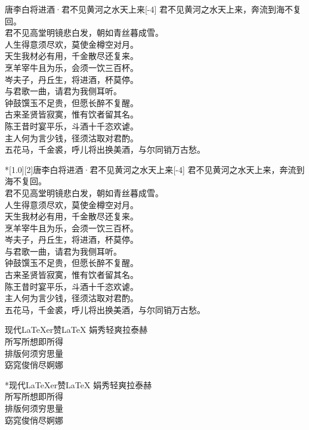 \documentclass{ctexart}
\begin{document}
\centering

\begin{poem}[1.0][2]{唐}{李白}{将进酒·君不见黄河之水天上来}[-4]
君不见黄河之水天上来，奔流到海不复回。\\
君不见高堂明镜悲白发，朝如青丝暮成雪。\\
人生得意须尽欢，莫使金樽空对月。\\
天生我材必有用，千金散尽还复来。\\
烹羊宰牛且为乐，会须一饮三百杯。\\
岑夫子，丹丘生，将进酒，杯莫停。\\
与君歌一曲，请君为我侧耳听。\\
钟鼓馔玉不足贵，但愿长醉不复醒。\\
古来圣贤皆寂寞，惟有饮者留其名。\\
陈王昔时宴平乐，斗酒十千恣欢谑。\\
主人何为言少钱，径须沽取对君酌。\\
五花马，千金裘，呼儿将出换美酒，与尔同销万古愁。
\end{poem}

\begin{poem}*[1.0][2]{唐}{李白}{将进酒·君不见黄河之水天上来}[-4]
君不见黄河之水天上来，奔流到海不复回。\\
君不见高堂明镜悲白发，朝如青丝暮成雪。\\
人生得意须尽欢，莫使金樽空对月。\\
天生我材必有用，千金散尽还复来。\\
烹羊宰牛且为乐，会须一饮三百杯。\\
岑夫子，丹丘生，将进酒，杯莫停。\\
与君歌一曲，请君为我侧耳听。\\
钟鼓馔玉不足贵，但愿长醉不复醒。\\
古来圣贤皆寂寞，惟有饮者留其名。\\
陈王昔时宴平乐，斗酒十千恣欢谑。\\
主人何为言少钱，径须沽取对君酌。\\
五花马，千金裘，呼儿将出换美酒，与尔同销万古愁。
\end{poem}

  \begin{poem}{现代}{\LaTeX{}er}{赞\textbullet{}\LaTeX{}}
    娟秀轻爽拉泰赫\\
    所写所想即所得\\
    排版何须穷思量\\
    窈窕俊俏尽婀娜
  \end{poem}
  
  \begin{poem}*{现代}{\LaTeX{}er}{赞\textbullet{}\LaTeX{}}
    娟秀轻爽拉泰赫\\
    所写所想即所得\\
    排版何须穷思量\\
    窈窕俊俏尽婀娜
  \end{poem}

  
\end{document}
